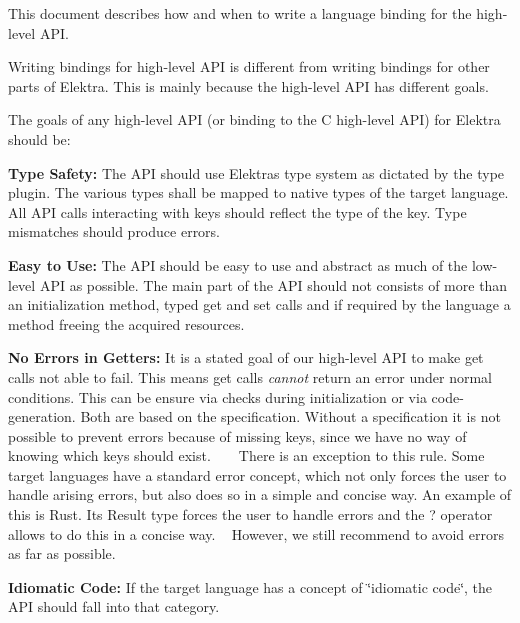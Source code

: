 This document describes how and when to write a language binding for the high-\/level A\+PI.

Writing bindings for high-\/level A\+PI is different from writing bindings for other parts of Elektra. This is mainly because the high-\/level A\+PI has different goals.

The goals of any high-\/level A\+PI (or binding to the C high-\/level A\+PI) for Elektra should be\+:


\begin{DoxyItemize}
\item {\bfseries Type Safety\+:} The A\+PI should use Elektra\textquotesingle{}s type system as dictated by the {\ttfamily type} plugin. The various types shall be mapped to native types of the target language. All A\+PI calls interacting with keys should reflect the type of the key. Type mismatches should produce errors.
\item {\bfseries Easy to Use\+:} The A\+PI should be easy to use and abstract as much of the low-\/level A\+PI as possible. The main part of the A\+PI should not consists of more than an initialization method, typed {\ttfamily get} and {\ttfamily set} calls and if required by the language a method freeing the acquired resources.
\item {\bfseries No Errors in Getters\+:} It is a stated goal of our high-\/level A\+PI to make {\ttfamily get} calls not able to fail. This means {\ttfamily get} calls {\itshape cannot} return an error under normal conditions. This can be ensure via checks during initialization or via code-\/generation. Both are based on the specification. Without a specification it is not possible to prevent errors because of missing keys, since we have no way of knowing which keys should exist. ~\newline
~\newline
 There is an exception to this rule. Some target languages have a standard error concept, which not only forces the user to handle arising errors, but also does so in a simple and concise way. An example of this is Rust. Its {\ttfamily Result} type forces the user to handle errors and the {\ttfamily ?} operator allows to do this in a concise way. ~\newline
 However, we still recommend to avoid errors as far as possible.
\item {\bfseries Idiomatic Code\+:} If the target language has a concept of \char`\"{}idiomatic code\char`\"{}, the A\+PI should fall into that category.
\end{DoxyItemize}

